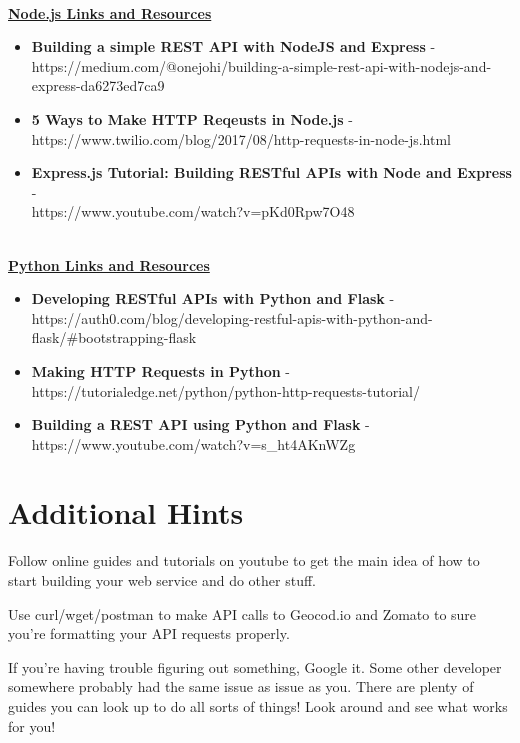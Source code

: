 \documentclass{article}
\begin{document}
\-\ \\
\textbf{\underline{Node.js Links and Resources}}
\begin{itemize} 
	\item \textbf{Building a simple REST API with NodeJS and Express} - \\ https://medium.com/@onejohi/building-a-simple-rest-api-with-nodejs-and-express-da6273ed7ca9
	\item \textbf{5 Ways to Make HTTP Reqeusts in Node.js} - \\ https://www.twilio.com/blog/2017/08/http-requests-in-node-js.html
	\item \textbf{Express.js Tutorial:  Building RESTful APIs with Node and Express} - \\https://www.youtube.com/watch?v=pKd0Rpw7O48
\end{itemize}

\-\ \\
\textbf{\underline{Python Links and Resources}}
\begin{itemize} 
	\item \textbf{Developing RESTful APIs with Python and Flask} - \\ https://auth0.com/blog/developing-restful-apis-with-python-and-flask/\#bootstrapping-flask
	\item \textbf{Making HTTP Requests in Python} - https://tutorialedge.net/python/python-http-requests-tutorial/
	\item \textbf{Building a REST API using Python and Flask} - https://www.youtube.com/watch?v=s\_ht4AKnWZg
\end{itemize}	




\section*{Additional Hints} %
\begin{info}
Follow online guides and tutorials on youtube to get the main idea of how to start building your web service and do other stuff.
\end{info}
\begin{info}
Use curl/wget/postman to make API calls to Geocod.io and Zomato to sure you're formatting your API requests properly. 
\end{info}
\begin{info}
If you're having trouble figuring out something, Google it. Some other developer somewhere probably had the same issue as issue as you. There are plenty of guides you can look up to do all sorts of things! Look around and see what works for you!
\end{info}
\end{document}
